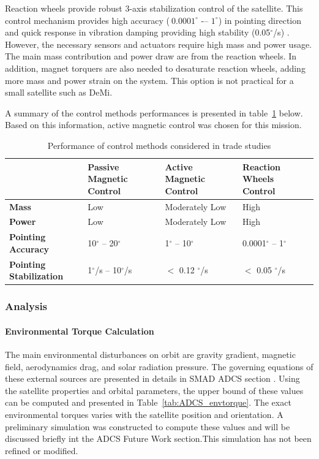 \documentclass[12pt]{article}
\begin{document}
Reaction wheels provide robust 3-axis stabilization control of the satellite. This control mechanism provides high accuracy ($~ 0.0001^\circ$ -– $1^\circ$) in pointing direction and quick response in vibration damping providing high stability (0.05$^\circ$/s) \cite{adcs_smad1}. However, the necessary sensors and actuators require high mass and power usage. The main mass contribution and power draw are from the reaction wheels. In addition, magnet torquers are also needed to desaturate reaction wheels, adding more mass and power strain on the system. This option is not practical for a small satellite such as DeMi. 

A summary of the control methods performances is presented in table~\ref{tab:ADCS_trade} below. Based on this information, active magnetic control was chosen for this mission. 

\begin{table}[htbp]
  \centering
  \caption{Performance of control methods considered in trade studies}
    \begin{tabular}{|p{4cm}|p{3cm}|p{3cm}|p{3cm}|}
    \hline
          & \textbf{Passive Magnetic Control} & \textbf{Active Magnetic Control} & \textbf{Reaction Wheels Control } \bigstrut\\
    \hline
    \textbf{Mass } & Low   & Moderately Low & High  \bigstrut\\
    \hline
    \textbf{Power} & Low   & Moderately Low & High \bigstrut\\
    \hline
    \textbf{Pointing  Accuracy} &  10$^\circ$ -- 20$^\circ$ &  1$^\circ$ -- 10$^\circ$ &  0.0001$^\circ$ -- 1$^\circ$ \bigstrut\\
    \hline
    \textbf{Pointing Stabilization} & 1$^\circ$/s  -- 10$^\circ$/s & $<$ 0.12 $^\circ$/s & $<$ 0.05 $^\circ$/s \bigstrut\\
    \hline
    \end{tabular}%
  \label{tab:ADCS_trade}%
\end{table}%




			
			\subsubsection{Analysis}
			\label{adcs_analysis}
				\paragraph{Environmental Torque Calculation}
				The main environmental disturbances on orbit are gravity gradient, magnetic field, aerodynamics drag, and solar radiation pressure. The governing equations of these external sources are presented in details in SMAD ADCS section \cite{adcs_smad2}. Using the satellite properties and orbital parameters, the upper bound of these values can be computed and presented in Table~\ref{tab:ADCS_envtorque}. The exact environmental torques varies with the satellite position and orientation. A preliminary simulation was constructed to compute these values and will be discussed briefly int the ADCS Future Work section.This simulation has not been refined or modified.
				
\end{document}
